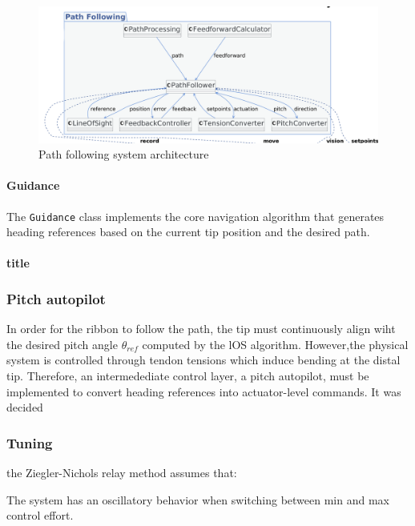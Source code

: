 \begin{figure}[H]
    \centering
    \includegraphics[width=\linewidth]{images/Software documentation/pathfollowingmodules.png}
    \caption{Path following system architecture}
    \label{fig:pathfolloingmodules}
\end{figure}



\paragraph*{Guidance}
The \texttt{Guidance} class implements the core navigation algorithm that generates heading references based on the current tip position and the desired path.

\paragraph*{title}

\subsubsection{Pitch autopilot}
In order for the ribbon to follow the path, the tip must continuously align wiht the desired pitch angle \(\theta_{ref}\) computed by the lOS algorithm. However,the physical system is controlled through tendon tensions which induce bending at the distal tip. Therefore, an intermedediate control layer, a pitch autopilot, must be implemented to convert heading references into actuator-level commands.
\newline \newline
It was decided 

\subsubsection{Tuning}
the Ziegler-Nichols relay method assumes that:

The system has an oscillatory behavior when switching between min and max control effort.

